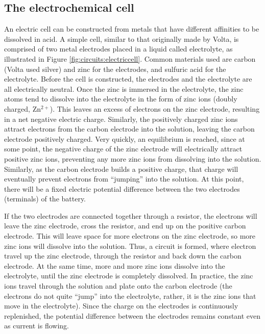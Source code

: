 \subsection{The electrochemical cell}
An electric cell can be constructed from metals that have different affinities to be dissolved in acid. A simple cell, similar to that originally made by Volta, is comprised of two metal electrodes placed in a liquid called electrolyte, as illustrated in Figure \ref{fig:circuits:electriccell}. Common materials used are carbon (Volta used silver) and zinc for the electrodes, and sulfuric acid for the electrolyte. Before the cell is constructed, the electrodes and the electrolyte are all electrically neutral.
Once the zinc is immersed in the electrolyte, the zinc atoms tend to dissolve into the electrolyte in the form of zinc ions (doubly charged, Zn$^{2+}$). This leaves an excess of electrons on the zinc electrode, resulting in a net negative electric charge. Similarly, the positively charged zinc ions attract electrons from the carbon electrode into the solution, leaving the carbon electrode positively charged. Very quickly, an equilibrium is reached, since at some point, the negative charge of the zinc electrode will electrically attract positive zinc ions, preventing any more zinc ions from dissolving into the solution. Similarly, as the carbon electrode builds a positive charge, that charge will eventually prevent electrons from ``jumping'' into the solution. At this point, there will be a fixed electric potential difference between the two electrodes (terminals) of the battery. 

If the two electrodes are connected together through a resistor, the electrons will leave the zinc electrode, cross the resistor, and end up on the positive carbon electrode. This will leave space for more electrons on the zinc electrode, so more zinc ions will dissolve into the solution. Thus, a circuit is formed, where electron travel up the zinc electrode, through the resistor and back down the carbon electrode. At the same time, more and more zinc ions dissolve into the electrolyte, until the zinc electrode is completely dissolved. In practice, the zinc ions travel through the solution and plate onto the carbon electrode (the electrons do not quite ``jump'' into the electrolyte, rather, it is the zinc ions that move in the electrolyte). Since the charge on the electrodes is continuously replenished, the potential difference between the electrodes remains constant even as current is flowing.


